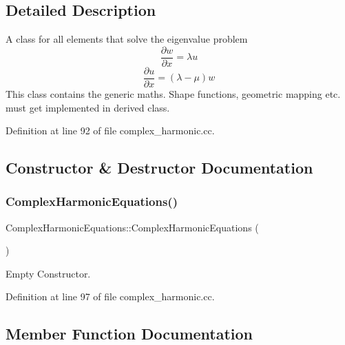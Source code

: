 \subsection{Detailed Description}
A class for all elements that solve the eigenvalue problem \[ \frac{\partial w}{\partial x} = \lambda u \] \[ \frac{\partial u}{\partial x} = (\lambda - \mu) w \] This class contains the generic maths. Shape functions, geometric mapping etc. must get implemented in derived class. 

Definition at line 92 of file complex\+\_\+harmonic.\+cc.



\subsection{Constructor \& Destructor Documentation}
\mbox{\label{classComplexHarmonicEquations_aa93feb265f731b0d82c3c1c4c29f183d}} 
\subsubsection{\texorpdfstring{Complex\+Harmonic\+Equations()}{ComplexHarmonicEquations()}}
{\footnotesize\ttfamily Complex\+Harmonic\+Equations\+::\+Complex\+Harmonic\+Equations (\begin{DoxyParamCaption}{ }\end{DoxyParamCaption})\hspace{0.3cm}{\ttfamily [inline]}}



Empty Constructor. 



Definition at line 97 of file complex\+\_\+harmonic.\+cc.



\subsection{Member Function Documentation}
\mbox{\label{classComplexHarmonicEquations_a59048c598e2fba3e11aa5985ffaf4d76}} 
